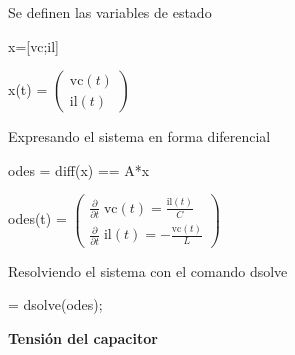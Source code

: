 \documentclass[10pt,a4paper]{article} %
\begin{document}
	\begin{par}
		\begin{flushleft}
			Se definen las variables de estado
		\end{flushleft}
	\end{par}
	
	\begin{matlabcode}
		x=[vc;il]
	\end{matlabcode}
	\begin{matlabsymbolicoutput}
		x(t) = 
		$\displaystyle \left(\begin{array}{c}
		\textrm{vc}\left(t\right)\\
		\textrm{il}\left(t\right)
		\end{array}\right)$
	\end{matlabsymbolicoutput}
	
	\begin{par}
		\begin{flushleft}
			Expresando el sistema en forma diferencial
		\end{flushleft}
	\end{par}
	
	\begin{matlabcode}
		odes = diff(x) == A*x
	\end{matlabcode}
	\begin{matlabsymbolicoutput}
		odes(t) = 
		$\displaystyle \left(\begin{array}{c}
		\frac{\partial }{\partial t}\;\textrm{vc}\left(t\right)=\frac{\textrm{il}\left(t\right)}{C}\\
		\frac{\partial }{\partial t}\;\textrm{il}\left(t\right)=-\frac{\textrm{vc}\left(t\right)}{L}
		\end{array}\right)$
	\end{matlabsymbolicoutput}
	
	\begin{par}
		\begin{flushleft}
			Resolviendo el sistema con el comando dsolve
		\end{flushleft}
	\end{par}
	
	\begin{matlabcode}
		 = dsolve(odes);
	\end{matlabcode}
	
	\begin{par}
		\begin{flushleft}
			\textbf{Tensión del capacitor}
		\end{flushleft}
	\end{par}
	
\end{document}
